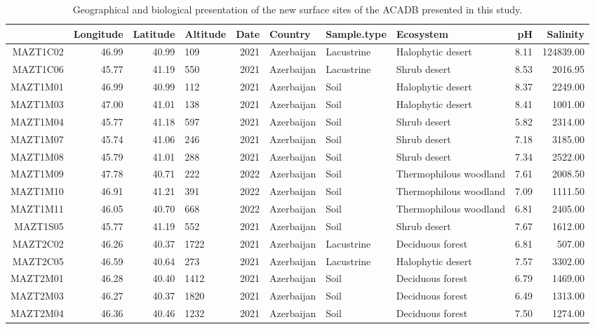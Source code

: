 \begin{table}[ht]
\centering
\caption{Geographical and biological presentation of the new surface sites of the ACADB presented in this study.} 
\label{Table_SI_metadata}
\begin{tabular}{rrrlrlllrr}
  \toprule
 & Longitude & Latitude & Altitude & Date & Country & Sample.type & Ecosystem & pH & Salinity \\ 
  \midrule
MAZT1C02 & 46.99 & 40.99 & 109 & 2021 & Azerbaijan & Lacustrine & Halophytic desert & 8.11 & 124839.00 \\ 
  MAZT1C06 & 45.77 & 41.19 & 550 & 2021 & Azerbaijan & Lacustrine & Shrub desert & 8.53 & 2016.95 \\ 
  MAZT1M01 & 46.99 & 40.99 & 112 & 2021 & Azerbaijan & Soil & Halophytic desert & 8.37 & 2249.00 \\ 
  MAZT1M03 & 47.00 & 41.01 & 138 & 2021 & Azerbaijan & Soil & Halophytic desert & 8.41 & 1001.00 \\ 
  MAZT1M04 & 45.77 & 41.18 & 597 & 2021 & Azerbaijan & Soil & Shrub desert & 5.82 & 2314.00 \\ 
  MAZT1M07 & 45.74 & 41.06 & 246 & 2021 & Azerbaijan & Soil & Shrub desert & 7.18 & 3185.00 \\ 
  MAZT1M08 & 45.79 & 41.01 & 288 & 2021 & Azerbaijan & Soil & Shrub desert & 7.34 & 2522.00 \\ 
  MAZT1M09 & 47.78 & 40.71 & 222 & 2022 & Azerbaijan & Soil & Thermophilous woodland & 7.61 & 2008.50 \\ 
  MAZT1M10 & 46.91 & 41.21 & 391 & 2022 & Azerbaijan & Soil & Thermophilous woodland & 7.09 & 1111.50 \\ 
  MAZT1M11 & 46.05 & 40.70 & 668 & 2022 & Azerbaijan & Soil & Thermophilous woodland & 6.81 & 2405.00 \\ 
  MAZT1S05 & 45.77 & 41.19 & 552 & 2021 & Azerbaijan & Soil & Shrub desert & 7.67 & 1612.00 \\ 
  MAZT2C02 & 46.26 & 40.37 & 1722 & 2021 & Azerbaijan & Lacustrine & Deciduous forest & 6.81 & 507.00 \\ 
  MAZT2C05 & 46.59 & 40.64 & 273 & 2021 & Azerbaijan & Lacustrine & Halophytic desert & 7.57 & 3302.00 \\ 
  MAZT2M01 & 46.28 & 40.40 & 1412 & 2021 & Azerbaijan & Soil & Deciduous forest & 6.79 & 1469.00 \\ 
  MAZT2M03 & 46.27 & 40.37 & 1820 & 2021 & Azerbaijan & Soil & Deciduous forest & 6.49 & 1313.00 \\ 
  MAZT2M04 & 46.36 & 40.46 & 1232 & 2021 & Azerbaijan & Soil & Deciduous forest & 7.50 & 1274.00 \\ 

\end{tabular}
\end{table}
